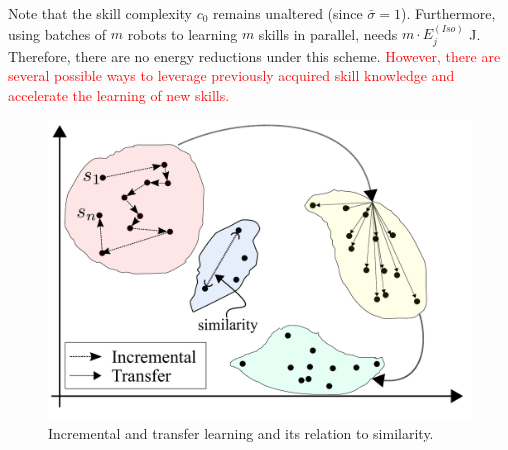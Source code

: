 Note that the skill complexity $c_0$ remains unaltered (since $\bar{\sigma} = 1$). Furthermore, using batches of $m$ robots to learning $m$ skills in parallel, needs $m\cdot E^{(Iso)}_j$ \unit[]{J}. Therefore, there are no energy reductions under this scheme. \textcolor{red}{However, there are several possible ways to leverage previously acquired skill knowledge and accelerate the learning of new skills.}
\begin{figure}[!h]
	\centering
	\includegraphics[width=0.9\columnwidth]{fig/incremental_transfer_similarity_v2.pdf}
	\caption{Incremental and transfer learning and its relation to similarity.}
	\label{fig:incremental_transfer_similarity}
\end{figure}
